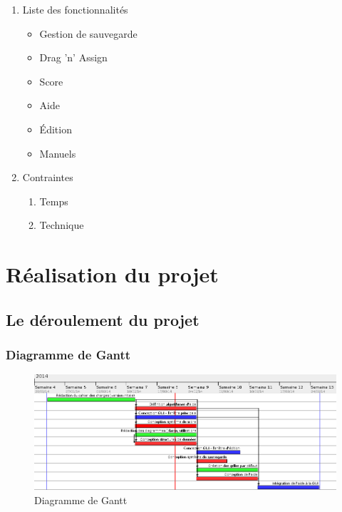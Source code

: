\documentclass[12pt]{beamer}
\begin{document}
   \begin{frame}
   \begin{enumerate}
   \item Liste des fonctionnalités
    
    \begin{itemize}
        \item Gestion de sauvegarde
        \item Drag 'n' Assign
        \item Score
        \item Aide
        \item Édition
        \item Manuels
    \end{itemize}
    
    
    \pause
    \item Contraintes 
    \begin{enumerate}
        \item Temps
        \item Technique
    \end{enumerate}
    
    
    \end{enumerate}
\end{frame}


\section{Réalisation du projet}
\subsection{Le déroulement du projet}


\begin{frame}
  \frametitle{Diagramme de Gantt}
  \begin{figure}[t]
    \centering
    \includegraphics[scale=0.38]{data/ganttDiagram}
    \caption{Diagramme de Gantt}
  \end{figure}
\end{frame}
\end{document}
